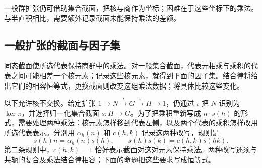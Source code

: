 \ProseParagraphBreak
一般群扩张仍可借助集合截面，把核与商作为坐标；困难在于这些坐标下的乘法。与半直积相比，需要额外记录截面未能保持乘法的差额。

\subsection{一般扩张的截面与因子集}
\label{b1:subsec:0603:03}

同态截面使所选代表保持商群中的乘法。对一般集合截面，代表元相乘与乘积的代表之间可能相差一个核元素；记录这些核元素，就得到下面的因子集。结合律将给出它们的相容恒等式，更换截面则改变这组乘法数据；将具体比较这些变化。

\ProseParagraphBreak
以下允许核不交换。给定扩张 \(1\rightarrow N\xrightarrow{\iota}G\xrightarrow{\pi}H\rightarrow1\)，仍通过 \(\iota\) 把 \(N\) 识别为 \(\ker\pi\)，并选择归一化集合截面 \(s:H\rightarrow G\)。为了把乘积重新写成 \(n\cdot s(h)\) 的形式，需要处理两种乘法：核元素怎样移到代表左侧，以及两个代表的乘积怎样改用所选代表表示。分别用 \(\alpha_h(n)\) 和 \(c(h,k)\) 记录这两种改写，规则是
\[
	s(h)n=\alpha_h(n)s(h),\qquad s(h)s(k)=c(h,k)s(hk).
\]
第二条规则中，\(c(h,k)=1\) 恰好表示截面对这对元素保持乘法。两种改写还须与共轭的复合及乘法结合律相容；下面的命题把这些要求写成恒等式。

